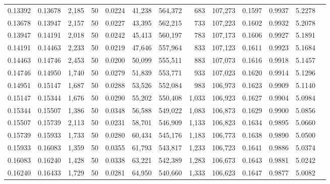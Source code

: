 \begin{tabular}{rrrrrrrrrrrrr}
0.13392 & 0.13678 & 2,185 &  50 &                                     0.0224 &  41,238 & 564,372 &     683 & 107,273 & 0.1597 & 0.9937 & 5.2278 \\
0.13678 & 0.13947 & 2,157 &  50 &                                     0.0227 &  43,395 & 562,215 &     733 & 107,223 & 0.1602 & 0.9932 & 5.2078 \\
0.13947 & 0.14191 & 2,018 &  50 &                                     0.0242 &  45,413 & 560,197 &     783 & 107,173 & 0.1606 & 0.9927 & 5.1891 \\
0.14191 & 0.14463 & 2,233 &  50 &                                     0.0219 &  47,646 & 557,964 &     833 & 107,123 & 0.1611 & 0.9923 & 5.1684 \\
0.14463 & 0.14746 & 2,453 &  50 &                                     0.0200 &  50,099 & 555,511 &     883 & 107,073 & 0.1616 & 0.9918 & 5.1457 \\
0.14746 & 0.14950 & 1,740 &  50 &                                     0.0279 &  51,839 & 553,771 &     933 & 107,023 & 0.1620 & 0.9914 & 5.1296 \\
0.14951 & 0.15147 & 1,687 &  50 &                                     0.0288 &  53,526 & 552,084 &     983 & 106,973 & 0.1623 & 0.9909 & 5.1140 \\
0.15147 & 0.15344 & 1,676 &  50 &                                     0.0290 &  55,202 & 550,408 &   1,033 & 106,923 & 0.1627 & 0.9904 & 5.0984 \\
0.15344 & 0.15507 & 1,386 &  50 &                                     0.0348 &  56,588 & 549,022 &   1,083 & 106,873 & 0.1629 & 0.9900 & 5.0856 \\
0.15507 & 0.15739 & 2,113 &  50 &                                     0.0231 &  58,701 & 546,909 &   1,133 & 106,823 & 0.1634 & 0.9895 & 5.0660 \\
0.15739 & 0.15933 & 1,733 &  50 &                                     0.0280 &  60,434 & 545,176 &   1,183 & 106,773 & 0.1638 & 0.9890 & 5.0500 \\
0.15933 & 0.16083 & 1,359 &  50 &                                     0.0355 &  61,793 & 543,817 &   1,233 & 106,723 & 0.1641 & 0.9886 & 5.0374 \\
0.16083 & 0.16240 & 1,428 &  50 &                                     0.0338 &  63,221 & 542,389 &   1,283 & 106,673 & 0.1643 & 0.9881 & 5.0242 \\
0.16240 & 0.16433 & 1,729 &  50 &                                     0.0281 &  64,950 & 540,660 &   1,333 & 106,623 & 0.1647 & 0.9877 & 5.0082 \\

\end{tabular}
